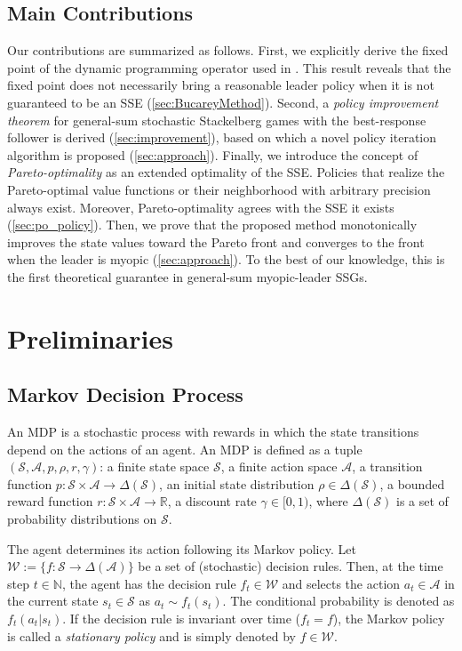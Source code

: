 \documentclass{acml}
\providecommand{\R}{\mathbb{R}} %
\providecommand{\N}{\mathbb{N}} %
\providecommand{\x}{\times}
\begin{document}
\subsection{Main Contributions}
Our contributions are summarized as follows.
%
First, we explicitly derive the fixed point of the dynamic programming operator used in \citet{Bucarey2022-ro,Zhang2020-hw}.
This result reveals that the fixed point does not necessarily bring a reasonable leader policy when it is not guaranteed to be an SSE (\cref{sec:BucareyMethod}).
%
Second, a \emph{policy improvement theorem} for general-sum stochastic Stackelberg games with the best-response follower is derived (\cref{sec:improvement}), based on which a novel policy iteration algorithm is proposed (\cref{sec:approach}). 
%
Finally, we introduce the concept of \emph{Pareto-optimality} as an extended optimality of the SSE.
Policies that realize the Pareto-optimal value functions or their neighborhood with arbitrary precision always exist. 
Moreover, Pareto-optimality agrees with the SSE it exists (\cref{sec:po_policy}).
Then, we prove that the proposed method monotonically improves the state values toward the Pareto front and converges to the front when the leader is myopic (\cref{sec:approach}).
To the best of our knowledge, this is the first theoretical guarantee in general-sum myopic-leader SSGs.


\section{Preliminaries}\label{sec:preliminaries}

\subsection{Markov Decision Process}

An MDP is a stochastic process with rewards in which the state transitions depend on the actions of an agent.
An MDP is defined as a tuple $(\mathcal{S},\mathcal{A},p,\rho,r,\gamma)$: a finite state space $\mathcal{S}$, a finite action space $\mathcal{A}$, a transition function $p: \mathcal{S}\x\mathcal{A}\to \Delta(\mathcal{S})$, an initial state distribution $\rho\in\Delta(\mathcal{S})$, a bounded reward function $r: \mathcal{S}\x\mathcal{A}\to\R$, a discount rate $\gamma\in[0,1)$, where $\Delta(\mathcal{S})$ is a set of probability distributions on $\mathcal{S}$.

The agent determines its action following its Markov policy. 
Let $\mathcal{W}:=\{f:\mathcal{S}\to\Delta(\mathcal{A})\}$ be a set of (stochastic) decision rules. Then, at the time step $t\in\N$, the agent has the decision rule $f_t\in\mathcal{W}$ and selects the action $a_t\in\mathcal{A}$ in the current state $s_t\in\mathcal{S}$ as $a_t\sim f_t(s_t)$. 
The conditional probability is denoted as $f_t(a_t|s_t)$.
If the decision rule is invariant over time ($f_t=f$), the Markov policy is called a \textit{stationary policy} and is simply denoted by $f\in\mathcal{W}$.
\end{document}
